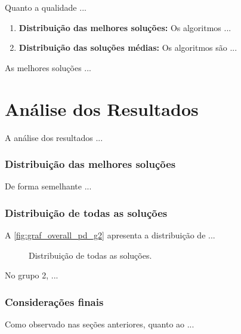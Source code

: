 Quanto a qualidade ...
		
	\begin{enumerate}
		\item \textbf{Distribuição das melhores soluções:} Os algoritmos ...
	
		\item \textbf{Distribuição das soluções médias:} Os algoritmos são ...
	\end{enumerate}			

As melhores soluções ...


\section{Análise dos Resultados}
\label{sec:results}

 A análise dos resultados ...


\subsubsection{Distribuição das melhores soluções}

De forma semelhante ...


\clearpage
\subsubsection{Distribuição de todas as soluções}

A \ref{fig:graf_overall_pd_g2} apresenta a distribuição de ...

\begin{figure}[htb]
	\centering

	\caption{Distribuição de todas as soluções.}
	\label{fig:graf_overall}
\end{figure}

No grupo 2, ...


\clearpage
\subsubsection{Considerações finais}

Como observado nas seções anteriores, quanto ao ...



